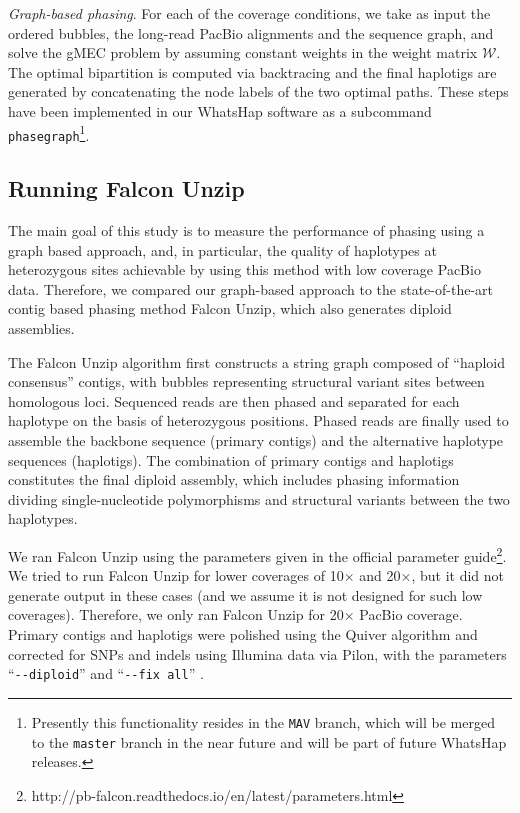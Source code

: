 \vspace{2cm}
\textit{Graph-based phasing}. For each of the coverage conditions, we take as input the ordered bubbles, the long-read PacBio alignments and the sequence graph, and solve the gMEC problem by assuming constant weights in the weight matrix $\mathcal{W}$.
The optimal bipartition is computed via backtracing and the final haplotigs are generated by concatenating the node labels of the two optimal paths.
These steps have been implemented in our WhatsHap software as a subcommand \texttt{phasegraph}\footnote{Presently this functionality resides in the \texttt{MAV} branch, which will be merged to the \texttt{master} branch in the near future and will be part of future WhatsHap releases.}.
\subsection{Running Falcon Unzip}
The main goal of this study is to measure the performance of phasing using a graph based approach, 
and, in particular, the quality of haplotypes at heterozygous sites achievable by using this method with low coverage PacBio data.
Therefore, we compared our graph-based approach to the state-of-the-art contig based phasing method Falcon Unzip, which also generates diploid assemblies.

The Falcon Unzip \citep{chin2016phased} algorithm first constructs a string graph composed of ``haploid consensus'' contigs, with bubbles representing structural variant sites between homologous loci. 
Sequenced reads are then phased and separated for each haplotype on the basis of heterozygous positions. 
Phased reads are finally used to assemble the backbone sequence (primary contigs) and the alternative haplotype sequences (haplotigs). 
The combination of primary contigs and haplotigs constitutes the final diploid assembly, which includes phasing information dividing single-nucleotide polymorphisms and structural variants between the two haplotypes.

We ran Falcon Unzip using the parameters given in the official parameter guide\footnote{http://pb-falcon.readthedocs.io/en/latest/parameters.html}.
We tried to run Falcon Unzip for lower coverages of 10$\times$ and 20$\times$, but it did not generate output in these cases (and we assume it is not designed for such low coverages).
Therefore, we only ran Falcon Unzip for 20$\times$ PacBio coverage.
Primary contigs and haplotigs were polished using the Quiver algorithm and corrected for SNPs and indels using Illumina data via Pilon, with the parameters ``\texttt{{-}{-}diploid}'' and ``\texttt{{-}{-}fix all}'' \citep{walker2014pilon}.

